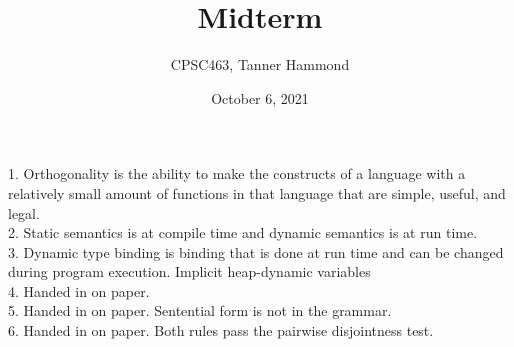 \documentclass{article}
\title{Midterm}
\author{CPSC463, Tanner Hammond}
\date{October 6, 2021}
\begin{document}
\maketitle

1. Orthogonality is the ability to make the constructs of a language with a relatively small amount of functions in that language that are simple, useful, and legal.\\

2. Static semantics is at compile time and dynamic semantics is at run time.\\

3. Dynamic type binding is binding that is done at run time and can be changed during program execution. Implicit heap-dynamic variables \\

4. Handed in on paper.\\

5. Handed in on paper. Sentential form is not in the grammar.\\

6. Handed in on paper. Both rules pass the pairwise disjointness test.\\
\end{document}

